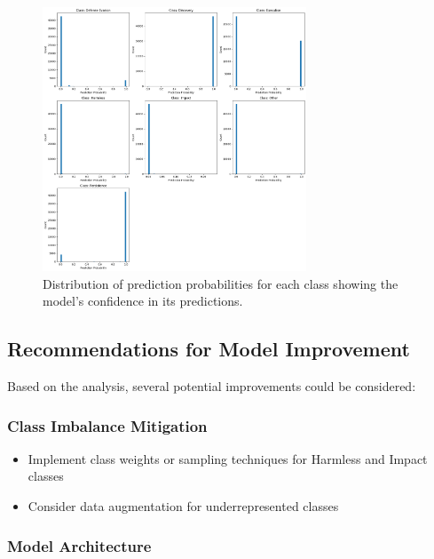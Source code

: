         \begin{figure}[h]
            \centering
            \includegraphics[width=0.7\textwidth]{../figures/plots/section4/probability_histograms.png}
            \caption{Distribution of prediction probabilities for each class showing the model's confidence in its predictions.}
            \label{fig:pred_prob}    
        \end{figure}
        
    \subsection{Recommendations for Model Improvement}

        Based on the analysis, several potential improvements could be considered:

        \subsubsection{Class Imbalance Mitigation}
        
            \begin{itemize}
                \item Implement class weights or sampling techniques for Harmless and Impact classes
                \item Consider data augmentation for underrepresented classes
            \end{itemize}

        \subsubsection{Model Architecture}
        
